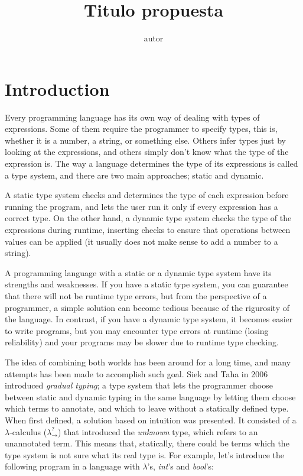 \documentclass[submission]{eptcs}
\title{Titulo propuesta}
\author{ autor
\institute{Department of Computer Science\\
University of Chile\\
Santiago, Chile}
}
\begin{document}
\maketitle

\section{Introduction}

Every programming language has its own way of dealing with types of expressions.
Some of them require the programmer to specify types, this is, whether it is a number, a string, or something else.
Others infer types just by looking at the expressions, and others simply don't know what the type of the expression is.
The way a language determines the type of its expressions is called a type system, and there are two main approaches; static and dynamic.

A static type system checks and determines the type of each expression before running the program, and lets the user run it only if every expression has a correct type.
On the other hand, a dynamic type system checks the type of the expressions during runtime, inserting checks to ensure that operations between values can be applied (it usually does not make sense to add a number to a string).


A programming language with a static or a dynamic type system have its strengths and weaknesses.
If you have a static type system, you can guarantee that there will not be runtime type errors, but from the perspective of a programmer, a simple solution can become tedious because of the rigurosity of the language.
In contrast, if you have a dynamic type system, it becomes easier to write programs, but you may encounter type errors at runtime (losing reliability) and your programs may be slower due to runtime type checking.

The idea of combining both worlds has been around for a long time, and many attempts has been made to accomplish such goal.
Siek and Taha in 2006 \cite{Siek2006GradualTF} introduced \textit{gradual typing};
a type system that lets the programmer choose between static and dynamic typing in the same language by letting them choose which terms to annotate, and which to leave without a statically defined type.
When first defined, a solution based on intuition was presented.
It consisted of a $\lambda$-calculus ($\lambda^{?}_{\rightarrow}$) that introduced the \textit{unknown} type, which refers to an unannotated term.
This means that, statically, there could be terms which the type system is not sure what its real type is.
For example, let's introduce the following program in a language with $\lambda$'s, \textit{int}'s and \textit{bool}'s:
\end{document}
